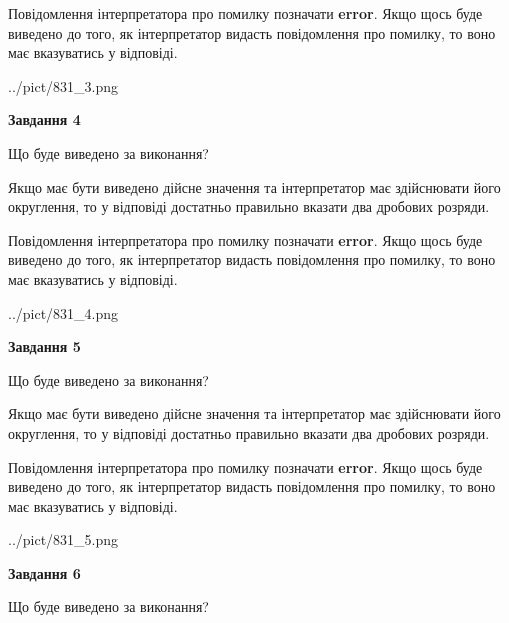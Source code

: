 \documentclass[12pt, ukrainian]{article}
\begin{document}
{\begin {Large}
Повідомлення інтерпретатора про помилку позначати \textbf{error}.
Якщо щось буде виведено до того, як інтерпретатор видасть повідомлення про помилку, 
то воно має вказуватись у відповіді. \par

\begin{center}
	{../pict/831_3.png}
\end{center}
\newpage

{\begin {center}\textbf{Завдання 4}\end {center}}\par
Що буде виведено за виконання? \par

Якщо має бути виведено дійсне значення та інтерпретатор має здійснювати його округлення, 
то у відповіді достатньо правильно вказати два дробових розряди.

Повідомлення інтерпретатора про помилку позначати \textbf{error}.
Якщо щось буде виведено до того, як інтерпретатор видасть повідомлення про помилку, 
то воно має вказуватись у відповіді. \par

\begin{center}
	{../pict/831_4.png}
\end{center}
\newpage

{\begin {center}\textbf{Завдання 5}\end {center}}\par
Що буде виведено за виконання? \par

Якщо має бути виведено дійсне значення та інтерпретатор має здійснювати його округлення, 
то у відповіді достатньо правильно вказати два дробових розряди.

Повідомлення інтерпретатора про помилку позначати \textbf{error}.
Якщо щось буде виведено до того, як інтерпретатор видасть повідомлення про помилку, 
то воно має вказуватись у відповіді. \par

\begin{center}
	{../pict/831_5.png}
\end{center}
\newpage

{\begin {center}\textbf{Завдання 6}\end {center}}\par
Що буде виведено за виконання? \par


\end{Large}}
\end{document}
